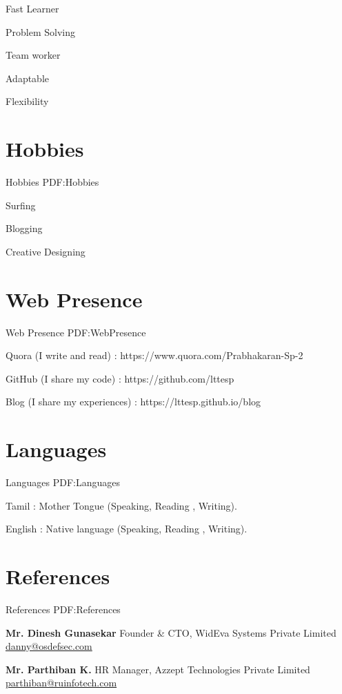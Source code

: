 \documentclass[letterpaper,MMMyyyy,nonstop]{simpleresumecv}
\begin{document}
\begin{body}
\BulletItem
Fast Learner

\GapNoBreak
\BulletItem
Problem Solving

\GapNoBreak
\BulletItem
Team worker

\GapNoBreak
\BulletItem
Adaptable

\GapNoBreak
\BulletItem
Flexibility


\section
{Hobbies}
{Hobbies}
{PDF:Hobbies}

\BulletItem
Surfing

%

\GapNoBreak
\BulletItem
Blogging

\GapNoBreak
\BulletItem
Creative Designing 


\section
{Web Presence}
{Web Presence}
{PDF:WebPresence}

\BulletItem
Quora (I write and read) : https://www.quora.com/Prabhakaran-Sp-2
\GapNoBreak

\BulletItem
GitHub (I share my code) : https://github.com/lttesp

\GapNoBreak
\BulletItem
Blog (I share my experiences) : https://lttesp.github.io/blog


\section
{Languages}
{Languages}
{PDF:Languages}

\BulletItem
Tamil : Mother Tongue (Speaking, Reading , Writing).

\GapNoBreak
\BulletItem
English : Native language (Speaking, Reading , Writing).


\section
{References}
{References}
{PDF:References}

\BulletItem
\textbf{Mr. Dinesh Gunasekar}
\newline
Founder \& CTO, WidEva Systems Private Limited
\newline
\href{mailto:danny@osdefsec.com}
{danny@osdefsec.com}

\BulletItem
\textbf{Mr. Parthiban K.}
\newline
HR Manager, Azzept Technologies Private Limited
\newline
\href{mailto:parthiban@ruinfotech.com}
{parthiban@ruinfotech.com}

\end{body}


\end{document}
